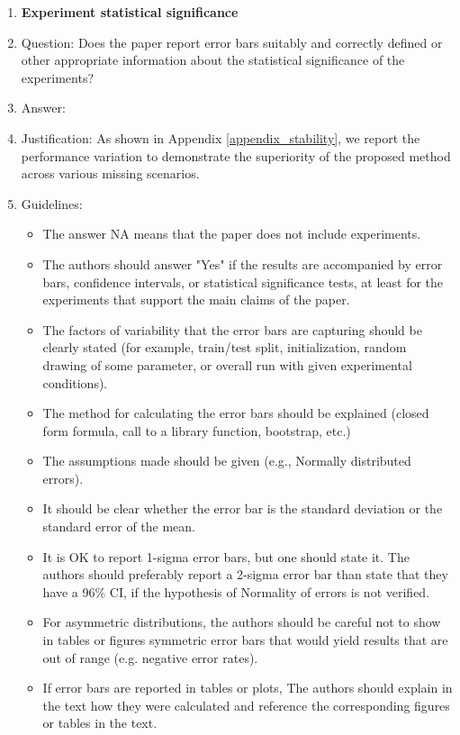 \documentclass{article}
\begin{document}
\begin{enumerate}
\item {\bf Experiment statistical significance}
    \item[] Question: Does the paper report error bars suitably and correctly defined or other appropriate information about the statistical significance of the experiments?
    \item[] Answer: \answerYes{} %
    \item[] Justification: As shown in Appendix \ref{appendix_stability}, we report the performance variation to demonstrate the superiority of the proposed method across various missing scenarios.
    \item[] Guidelines:
    \begin{itemize}
        \item The answer NA means that the paper does not include experiments.
        \item The authors should answer "Yes" if the results are accompanied by error bars, confidence intervals, or statistical significance tests, at least for the experiments that support the main claims of the paper.
        \item The factors of variability that the error bars are capturing should be clearly stated (for example, train/test split, initialization, random drawing of some parameter, or overall run with given experimental conditions).
        \item The method for calculating the error bars should be explained (closed form formula, call to a library function, bootstrap, etc.)
        \item The assumptions made should be given (e.g., Normally distributed errors).
        \item It should be clear whether the error bar is the standard deviation or the standard error of the mean.
        \item It is OK to report 1-sigma error bars, but one should state it. The authors should preferably report a 2-sigma error bar than state that they have a 96\% CI, if the hypothesis of Normality of errors is not verified.
        \item For asymmetric distributions, the authors should be careful not to show in tables or figures symmetric error bars that would yield results that are out of range (e.g. negative error rates).
        \item If error bars are reported in tables or plots, The authors should explain in the text how they were calculated and reference the corresponding figures or tables in the text.
    \end{itemize}


\end{enumerate}
\end{document}
